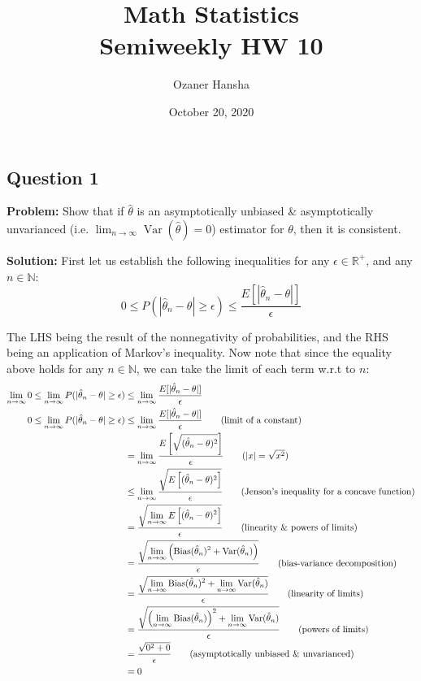 \documentclass{article}
\DeclareMathOperator{\Var}{Var}
\begin{document}
\title{Math Statistics\\ Semiweekly HW 10}
\author{Ozaner Hansha}
\date{October 20, 2020}
\maketitle

\subsection*{Question 1}
\noindent\textbf{Problem:} Show that if $\hat \theta$ is an asymptotically unbiased \& asymptotically unvarianced (i.e. $\displaystyle\lim_{n\to\infty}\Var(\hat{\theta})=0$) estimator for $\theta$, then it is consistent.
\bigskip

\noindent\textbf{Solution:} First let us establish the following inequalities for any $\epsilon\in\mathbb R^+$, and any $n\in\mathbb N$:
$$0\le P(|\hat\theta_n-\theta|\ge\epsilon)\le\frac{E[|\hat\theta_n-\theta|]}{\epsilon}$$

The LHS being the result of the nonnegativity of probabilities, and the RHS being an application of Markov's inequality. Now note that since the equality above holds for any $n\in\mathbb N$, we can take the limit of each term w.r.t to $n$:
\begin{align*}
\lim_{n\to\infty}0\le\lim_{n\to\infty}P(|\hat\theta_n-\theta|\ge\epsilon)&\le\lim_{n\to\infty}\frac{E[|\hat\theta_n-\theta|]}{\epsilon}\\
0\le\lim_{n\to\infty}P(|\hat\theta_n-\theta|\ge\epsilon)&\le\lim_{n\to\infty}\frac{E[|\hat\theta_n-\theta|]}{\epsilon}\tag{limit of a constant}\\
&=\lim_{n\to\infty}\frac{E\left[\sqrt{(\hat\theta_n-\theta)^2}\right]}{\epsilon}\tag{$|x|=\sqrt{x^2}$}\\
&\le\lim_{n\to\infty}\frac{\sqrt{E\left[(\hat\theta_n-\theta)^2\right]}}{\epsilon}\tag{Jenson's inequality for a concave function}\\
&=\frac{\sqrt{\displaystyle\lim_{n\to\infty}E\left[(\hat\theta_n-\theta)^2\right]}}{\epsilon}\tag{linearity \& powers of limits}\\
&=\frac{\sqrt{\displaystyle\lim_{n\to\infty}\left(\text{Bias}(\hat\theta_n)^2+\Var(\hat\theta_n)\right)}}{\epsilon}\tag{bias-variance decomposition}\\
&=\frac{\sqrt{\displaystyle\lim_{n\to\infty}\text{Bias}(\hat\theta_n)^2+\displaystyle\lim_{n\to\infty}\Var(\hat\theta_n)}}{\epsilon}\tag{linearity of limits}\\
&=\frac{\sqrt{\displaystyle\left(\lim_{n\to\infty}\text{Bias}(\hat\theta_n)\right)^2+\displaystyle\lim_{n\to\infty}\Var(\hat\theta_n)}}{\epsilon}\tag{powers of limits}\\
&=\frac{\sqrt{0^2+0}}{\epsilon}\tag{asymptotically unbiased \& unvarianced}\\
&=0
\end{align*}
\end{document}
